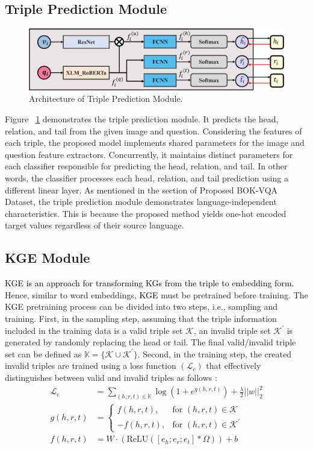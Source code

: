 \documentclass[letterpaper]{article} %
\newcommand{\kt}[1]{\textcolor{black}{#1}}
\begin{document}
\subsection{Triple Prediction Module}\label{subsec:TPModule}
\begin{figure}[h!]
\includegraphics[width=\linewidth]{model_images/TP_Module.pdf}
\caption{Architecture of Triple Prediction Module.}
\label{fig:TP Module}
\end{figure}

Figure ~\ref{fig:TP Module} demonstrates the triple prediction module. It predicts the head, relation, and tail from the given image and question. Considering the features of each triple, the proposed model implements shared parameters for the image and question feature extractors. Concurrently, it maintains distinct parameters for each classifier responsible for predicting the head, relation, and tail. In other words, the classifier processes each head, relation, and tail prediction using a different linear layer. As mentioned in the section of Proposed BOK-VQA Dataset, the triple prediction module demonstrates language-independent characteristics. This is because the proposed method yields one-hot encoded target values regardless of their source language.


\subsection{KGE Module}\label{subsec:KGEModule}

\kt{KGE is an approach for transforming KGs from the triple to embedding form.} Hence, similar to word embeddings, %
\kt{KGE} must be pretrained before training. The KGE pretraining process can be divided into two steps, i.e., sampling and training. First, in the sampling step, assuming that the triple information included in the training data is a valid triple set $\mathcal{K}$, an invalid triple set $\mathcal{K}^\prime$ is generated by randomly replacing the head or tail. The final valid/invalid triple set can be defined as $\mathbb{K} = \{\mathcal{K} \cup \mathcal{K}^\prime\}$. Second, in the training step, the created invalid triples are trained using a loss function $(\mathcal{L}_{c})$ that effectively distinguishes between valid and invalid triples as follows :
\begin{align}
\mathcal{L}_{c} &= \sum_{(h, r, t) \in \mathbb{K}} \log (1+e^{g(h, r, t)}) + \frac{\lambda}{2}||w||_2^2\\
g(h, r, t) &=\begin{cases}
f(h, r, t),  & \text{for $(h, r, t) \in \mathcal{K}$ }\\
-f(h, r, t), & \text{for $(h, r, t) \in \mathcal{K}^\prime$}
\end{cases} \\
f(h, r, t) &= W\cdot(\text{ReLU}([e_h; e_r; e_t] * \Omega)) + b
\end{align}
\end{document}
